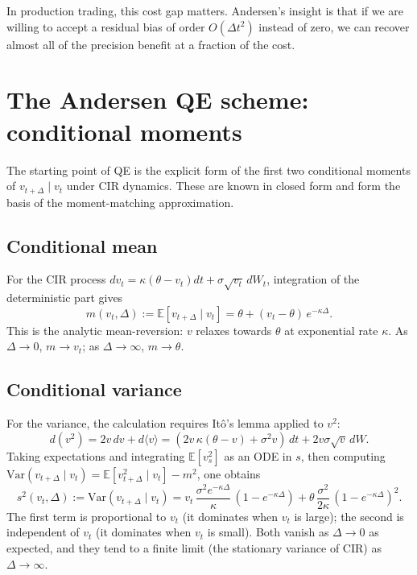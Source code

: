 \documentclass[11pt]{article}
\theoremstyle{plain}
\theoremstyle{definition}
\theoremstyle{remark}
\begin{document}
In production trading, this cost gap matters. Andersen's insight is that if we are willing to accept a residual bias of order $O(\Delta t^2)$ instead of zero, we can recover almost all of the precision benefit at a fraction of the cost.

\section{The Andersen QE scheme: conditional moments}

The starting point of QE is the explicit form of the first two conditional moments of $v_{t+\Delta} \mid v_t$ under CIR dynamics. These are known in closed form and form the basis of the moment-matching approximation.

\subsection{Conditional mean}

For the CIR process $dv_t = \kappa(\theta - v_t)dt + \sigma\sqrt{v_t}\,dW_t$, integration of the deterministic part gives
\begin{equation}
    m(v_t, \Delta) := \mathbb{E}[v_{t+\Delta} \mid v_t] = \theta + (v_t - \theta)\, e^{-\kappa\Delta}.                           \label{eq:cond-mean}
\end{equation}
This is the analytic mean-reversion: $v$ relaxes towards $\theta$ at exponential rate $\kappa$. As $\Delta \to 0$, $m \to v_t$; as $\Delta \to \infty$, $m \to \theta$.

\subsection{Conditional variance}

For the variance, the calculation requires Itô's lemma applied to $v^2$:
\[
    d(v^2) = 2 v\, dv + d\langle v \rangle = (2 v\, \kappa(\theta - v) + \sigma^2 v)\,dt + 2 v \sigma\sqrt{v}\,dW.
\]
Taking expectations and integrating $\mathbb{E}[v_s^2]$ as an ODE in $s$, then computing $\mathrm{Var}(v_{t+\Delta} \mid v_t) = \mathbb{E}[v_{t+\Delta}^2 \mid v_t] - m^2$, one obtains
\begin{equation}
    s^2(v_t, \Delta) := \mathrm{Var}(v_{t+\Delta} \mid v_t) = v_t\, \frac{\sigma^2 e^{-\kappa\Delta}}{\kappa}\,(1 - e^{-\kappa\Delta}) + \theta\, \frac{\sigma^2}{2\kappa}\,(1 - e^{-\kappa\Delta})^2.                                          \label{eq:cond-var}
\end{equation}
The first term is proportional to $v_t$ (it dominates when $v_t$ is large); the second is independent of $v_t$ (it dominates when $v_t$ is small). Both vanish as $\Delta \to 0$ as expected, and they tend to a finite limit (the stationary variance of CIR) as $\Delta \to \infty$.
\end{document}

